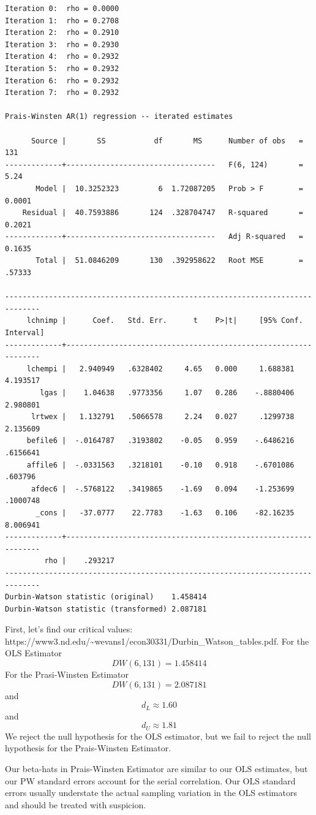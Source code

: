 \documentclass[
]{book}
\begin{document}
\begin{verbatim}
Iteration 0:  rho = 0.0000
Iteration 1:  rho = 0.2708
Iteration 2:  rho = 0.2910
Iteration 3:  rho = 0.2930
Iteration 4:  rho = 0.2932
Iteration 5:  rho = 0.2932
Iteration 6:  rho = 0.2932
Iteration 7:  rho = 0.2932

Prais-Winsten AR(1) regression -- iterated estimates

      Source |       SS           df       MS      Number of obs   =       131
-------------+----------------------------------   F(6, 124)       =      5.24
       Model |  10.3252323         6  1.72087205   Prob > F        =    0.0001
    Residual |  40.7593886       124  .328704747   R-squared       =    0.2021
-------------+----------------------------------   Adj R-squared   =    0.1635
       Total |  51.0846209       130  .392958622   Root MSE        =    .57333

------------------------------------------------------------------------------
     lchnimp |      Coef.   Std. Err.      t    P>|t|     [95% Conf. Interval]
-------------+----------------------------------------------------------------
     lchempi |   2.940949   .6328402     4.65   0.000     1.688381    4.193517
        lgas |    1.04638   .9773356     1.07   0.286    -.8880406    2.980801
      lrtwex |   1.132791   .5066578     2.24   0.027     .1299738    2.135609
     befile6 |  -.0164787   .3193802    -0.05   0.959    -.6486216    .6156641
     affile6 |  -.0331563   .3218101    -0.10   0.918    -.6701086     .603796
      afdec6 |  -.5768122   .3419865    -1.69   0.094    -1.253699    .1000748
       _cons |   -37.0777    22.7783    -1.63   0.106    -82.16235    8.006941
-------------+----------------------------------------------------------------
         rho |    .293217
------------------------------------------------------------------------------
Durbin-Watson statistic (original)    1.458414
Durbin-Watson statistic (transformed) 2.087181
\end{verbatim}

First, let's find our critical values:
https://www3.nd.edu/\textasciitilde wevans1/econ30331/Durbin\_Watson\_tables.pdf.
For the OLS Estimator
\[ DW(6,131) = 1.458414 \]
For the Prasi-Winsten Estimator
\[ DW(6,131) = 2.087181 \]
and \[ d_L \approx 1.60 \] and \[ d_U \approx 1.81 \]
We reject the null hypothesis for the OLS estimator, but we fail to reject
the null hypothesis for the Prais-Winsten Estimator.

Our beta-hats in Prais-Winsten Estimator are similar to our OLS estimates, but our PW
standard errors account for the serial correlation. Our OLS standard errors
usually understate the actual sampling variation in the OLS estimators and
should be treated with suspicion.
\end{document}
